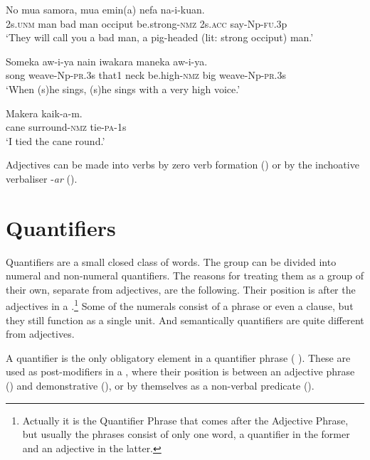 \ea%
\label{ex:x1766}
\gll No mua samora, mua emin(a) \textstyleEmphasizedVernacularWords{-} nefa na-i-kuan.\\
2s.\textsc{unm} man bad man occiput be.strong-\textsc{nmz} 2s.\textsc{acc} say-Np-\textsc{fu}.3p\\
\glt`They will call you a bad man, a pig-headed (lit: strong occiput) man.'
\z

\ea%
\label{ex:x1765}
\gll Someka aw-i-ya nain iwakara  maneka aw-i-ya.\\
song weave-Np-\textsc{pr}.3s that1 neck be.high-\textsc{nmz} big weave-Np-\textsc{pr}.3s\\
\glt`When (s)he sings, (s)he sings with a very high voice.'
\z

\ea%
\label{ex:x1767}
\gll Makera \textstyleEmphasizedVernacularWords{-} kaik-a-m. \\
cane surround-\textsc{nmz} tie-\textsc{pa}-1s\\
\glt`I tied the cane round.'
\z

Adjectives can be made into verbs by zero verb formation () or by the inchoative verbaliser \nobreakdash-\textit{ar} ().

\section{Quantifiers}
{}
Quantifiers are a small closed class of words. The group can be divided into numeral and non-numeral quantifiers. The reasons for treating them as a group of their own, separate from adjectives, are the following. Their position is after the adjectives in a .\footnote{Actually it is the Quantifier Phrase that comes after the Adjective Phrase, but usually the phrases consist of only one word, a quantifier in the former and an adjective in the latter.} Some of the numerals consist of a phrase or even a clause, but they still function as a single unit. And semantically quantifiers are quite different from adjectives.

A quantifier is the only obligatory element in a quantifier phrase ( ). These are used as post-modifiers in a , where their position is between an adjective phrase () and demonstrative (), or by themselves as a non-verbal predicate (). 

